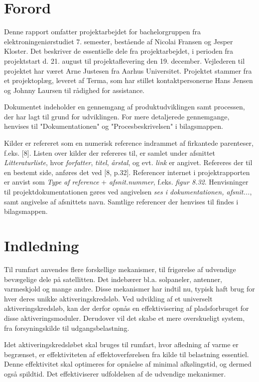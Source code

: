 
\chapter*{Forord}

Denne rapport omfatter projektarbejdet for bachelorgruppen fra elektroningeniørstudiet 7. semester, bestående af Nicolai Fransen og Jesper Kloster. Det beskriver de essentielle dele fra projektarbejdet, i perioden fra projektstart d. 21. august til projektaflevering den 19. december. Vejlederen til projektet har været Arne Justesen fra Aarhus Universitet. Projektet stammer fra et projektoplæg, leveret af Terma, som har stillet kontaktpersonerne Hans Jensen og Johnny Laursen til rådighed for assistance.

Dokumentet indeholder en gennemgang af produktudviklingen samt processen, der har lagt til grund for udviklingen. For mere detaljerede gennemgange, henvises til "Dokumentationen" og "Procesbeskrivelsen" i bilagsmappen.   

Kilder er refereret som en numerisk reference indrammet af firkantede parenteser, f.eks. [8]. Listen over kilder der refereres til, er samlet under afsnittet \textit{Litteraturliste}, hvor \textit{forfatter}, \textit{titel}, \textit{årstal}, og evt. \textit{link} er angivet. Refereres der til en bestemt side, anføres det ved [8, p.32]. Referencer internet i projektrapporten er anvist som \textit{Type af reference} + \textit{afsnit.nummer}, f.eks. \textit{figur 8.32}. Henvisninger til projektdokumentationen gøres ved  angivelsen \textit{ses i dokumentationen, afsnit...}, samt angivelse af afsnittets navn. Samtlige referencer der henvises til findes i bilagsmappen. 


{\let\clearpage\relax \chapter{Indledning}}
\noindent Til rumfart anvendes flere forskellige mekanismer, til frigørelse af udvendige bevægelige dele på satellitten. Det indebærer bl.a. solpaneler, antenner, varmeskjold og mange andre. Disse mekanismer har indtil nu, typisk haft brug for hver deres unikke aktiveringskredsløb. Ved udvikling af et universelt aktiveringskredsløb, kan der derfor opnås en effektivisering af pladsforbruget for disse aktiveringsmoduler. Derudover vil det skabe et mere overskueligt system, fra forsyningskilde til udgangsbelastning. 

Idet aktiveringskredsløbet skal bruges til rumfart, hvor afledning af varme er begrænset, er effektiviteten af effektoverførelsen fra kilde til belastning essentiel. Denne effektivitet skal optimeres for opnåelse af minimal afkølingstid, og dermed også spildtid. Det effektiviserer udfoldelsen af de udvendige mekanismer\cite{projekt-oplag}. 

